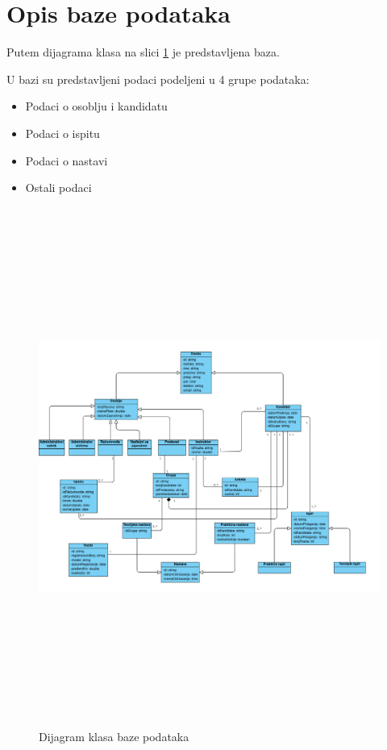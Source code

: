 \section {Opis baze podataka}
\label{sec:database}

Putem dijagrama klasa na slici \ref{fig:dijagram_klasa} je predstavljena baza.

U bazi su predstavljeni podaci podeljeni u 4 grupe podataka:
\begin{itemize}
    \item Podaci o osoblju i kandidatu
    \item Podaci o ispitu
    \item Podaci o nastavi
    \item Ostali podaci
\end{itemize}







\begin{figure}[H]
    \begin{center}
        \includegraphics[width=\textwidth, height=170mm]{Diagrams/dijagram_klasa.png}
        \caption {Dijagram klasa baze podataka}
        \label{fig:dijagram_klasa}
    \end{center}
\end{figure}
